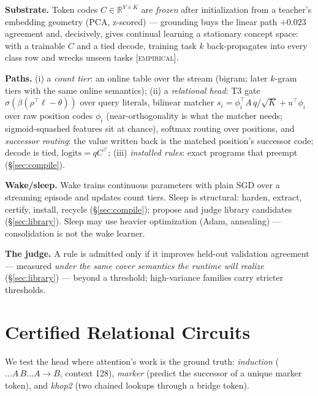 \documentclass[sigconf,nonacm]{acmart}
\newcommand{\tagp}[1]{\textsc{\small[#1]}}
\begin{document}
\textbf{Substrate.} Token codes $C \in \mathbb{R}^{V\times K}$ are \emph{frozen} after
initialization from a teacher's embedding geometry (PCA, z-scored) --- grounding buys the linear
path $+0.023$ agreement and, decisively, gives continual learning a stationary concept space: with
a trainable $C$ and a tied decode, training task $k$ back-propagates into every class row and
wrecks unseen tasks \tagp{empirical}.

\textbf{Paths.} (i) a \emph{count tier}: an online table over the stream (bigram; later $k$-gram
tiers with the same online semantics); (ii) a \emph{relational head}: T3 gate
$\sigma(\beta(\rho^\top \ell - \theta))$ over query literals, bilinear matcher
$s_i = \phi_i^\top A\, q/\sqrt{K} + u^\top \phi_i$ over raw position codes $\phi_i$ (near-orthogonality
is what the matcher needs; sigmoid-squashed features sit at chance), softmax routing over
positions, and \emph{successor routing}: the value written back is the matched position's
successor code; decode is tied, $\mathrm{logits} = qC^\top$; (iii) \emph{installed rules}: exact
programs that preempt (\S\ref{sec:compile}).

\textbf{Wake/sleep.} Wake trains continuous parameters with plain SGD over a streaming episode
and updates count tiers. Sleep is structural: harden, extract, certify, install, recycle
(\S\ref{sec:compile}); propose and judge library candidates (\S\ref{sec:library}). Sleep may use
heavier optimization (Adam, annealing) --- consolidation is not the wake learner.

\textbf{The judge.} A rule is admitted only if it improves held-out validation agreement ---
measured \emph{under the same cover semantics the runtime will realize}
(\S\ref{sec:library}) --- beyond a threshold; high-variance families carry stricter thresholds.

\section{Certified Relational Circuits}
\label{sec:circuits}

We test the head where attention's work is the ground truth: \emph{induction}
($\dots A\,B \dots A \to B$, context 128), \emph{marker} (predict the successor of a unique
marker token), and \emph{khop2} (two chained lookups through a bridge token).
\end{document}
